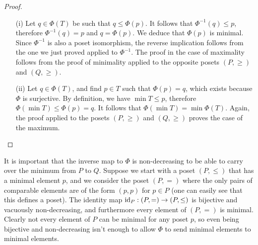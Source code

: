 \begin{proof}
    \begin{itemize}
        \item[(i)] Let $q \in \Phi(T)$ be such that $q \le \Phi(p)$. It follows that $\Phi^{-1}(q) \le p$, therefore $\Phi^{-1}(q) = p$ and $q = \Phi(p)$. We deduce that $\Phi(p)$ is minimal. Since $\Phi^{-1}$ is also a poset isomorphism, the reverse implication follows from the one we just proved applied to $\Phi^{-1}$. The proof in the case of maximality follows from the proof of minimality applied to the opposite posets $(P, \ge)$ and $(Q, \ge)$. 
        \\

        \item[(ii)] Let $q \in \Phi(T)$, and find $p \in T$ such that $\Phi(p) = q$, which exists because $\Phi$ is surjective. By definition, we have $\min T \le p$, therefore $\Phi(\min T) \le \Phi(p) = q$. It follows that $\Phi(\min T) = \min \Phi(T)$. Again, the proof applied to the posets $(P, \ge)$ and $(Q, \ge)$ proves the case of the maximum. 
        \\

    \end{itemize}
\end{proof}

\begin{remark}
    It is important that the inverse map to $\Phi$ is non-decreasing to be able to carry over the minimum from $P$ to $Q$. Suppose we start with a poset $(P,\le)$ that has a minimal element $p$, and we consider the poset $(P,=)$ where the only pairs of comparable elements are of the form $(p,p)$ for $p \in P$ (one can easily see that this defines a poset). The identity map $\operatorname{\mathrm{id}}_{P} : (P,=) \to (P, \le)$ is bijective and vacuously non-decreasing, and furthermore every element of $(P, =)$ is minimal. Clearly not every element of $P$ can be minimal for any poset $p$, so even being bijective and non-decreasing isn't enough to allow $\Phi$ to send minimal elements to minimal elements. 
\end{remark}

